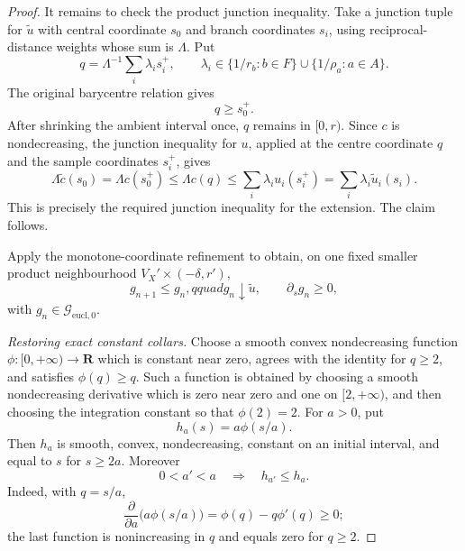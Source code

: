 \begin{proof}
It remains to check the product junction inequality.  Take a junction
tuple for $\widetilde u$ with central coordinate $s_0$ and branch
coordinates $s_i$, using reciprocal-distance weights whose sum is
$\Lambda$.  Put
\[
             q=\Lambda^{-1}\sum_i\lambda_i s_i^+,
             \qquad \lambda_i\in
               \{1/r_b:b\in F\}\cup\{1/\rho_a:a\in A\}.
\]
The original barycentre relation gives
\begin{equation}
                         q\geq s_0^+.
\label{eq:p071-star-finite-collar-positive-part-barycentre}
\end{equation}
After shrinking the ambient interval once, $q$ remains in $[0,r)$.
Since $c$ is nondecreasing, the junction inequality for $u$, applied at
the centre coordinate $q$ and the sample coordinates $s_i^+$, gives
\[
 \Lambda\widetilde c(s_0)
   =\Lambda c(s_0^+)
   \leq\Lambda c(q)
   \leq\sum_i\lambda_i u_i(s_i^+)
   =\sum_i\lambda_i\widetilde u_i(s_i).
\]
This is precisely the required junction inequality for the extension.
The claim follows.

Apply the monotone-coordinate refinement to obtain, on one fixed smaller
product neighbourhood $V_X'\times(-\delta,r')$,
\begin{equation}
        g_{n+1}\leq g_n,qquad g_n\downarrow\widetilde u,
        \qquad \partial_sg_n\geq0,
\label{eq:p071-star-finite-collar-euclidean-approximants}
\end{equation}
with $g_n\in\mathcal G_{\mathrm{eucl},0}$.

\medskip\noindent
\emph{Restoring exact constant collars.}
Choose a smooth convex nondecreasing function
$\phi:[0,+\infty)\to\mathbf R$ which is constant near zero, agrees with
the identity for $q\geq2$, and satisfies $\phi(q)\geq q$.  Such a function
is obtained by choosing a smooth nondecreasing derivative which is zero
near zero and one on $[2,+\infty)$, and then choosing the integration
constant so that $\phi(2)=2$.  For $a>0$, put
\begin{equation}
                         h_a(s)=a\phi(s/a).
\label{eq:p071-star-finite-collar-clamp}
\end{equation}
Then $h_a$ is smooth, convex, nondecreasing, constant on an initial
interval, and equal to $s$ for $s\geq2a$.  Moreover
\begin{equation}
              0<a'<a\quad\Longrightarrow\quad h_{a'}\leq h_a.
\label{eq:p071-star-finite-collar-clamp-order}
\end{equation}
Indeed, with $q=s/a$,
\[
       \frac{\partial}{\partial a}\bigl(a\phi(s/a)\bigr)
          =\phi(q)-q\phi'(q)\geq0;
\]
the last function is nonincreasing in $q$ and equals zero for $q\geq2$.


\end{proof}
